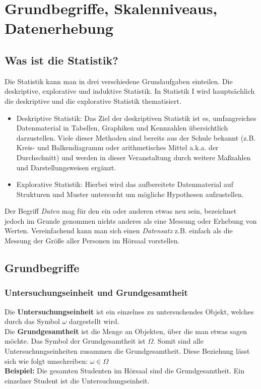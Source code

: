 \documentclass[a4paper]{article}
\begin{document}
\section{Grundbegriffe, Skalenniveaus, Datenerhebung}

\subsection{Was ist die Statistik?}

Die Statistik kann man in drei verschiedene Grundaufgaben einteilen. Die deskriptive, explorative und induktive Statistik. In Statistik I wird hauptsächlich die deskriptive und die explorative Statistik thematisiert.
\begin{itemize}
     \item Deskriptive Statistik: Das Ziel der deskriptiven Statistik ist es, umfangreiches Datenmaterial in Tabellen, Graphiken und Kennzahlen übersichtlich darzustellen. Viele dieser Methoden sind bereits aus der Schule bekannt (z.B. Kreis- und Balkendiagramm oder arithmetisches Mittel a.k.a. der Durchschnitt) und werden in dieser Veranstaltung durch weitere Ma\ss{}zahlen und Darstellungsweisen erg\"anzt.
     \item Explorative Statistik: Hierbei wird das aufbereitete Datenmaterial auf Strukturen und Muster untersucht um mögliche Hypothesen aufzustellen.
\end{itemize}

\noindent Der Begriff \textit{Daten} mag f\"ur den ein oder anderen etwas neu sein, bezeichnet jedoch im Grunde genommen nichts anderes als eine Messung oder Erhebung von Werten. Vereinfachend kann man sich einen \textit{Datensatz} z.B. einfach als die Messung der Gr\"o\ss{}e aller Personen im H\"orsaal vorstellen.

\subsection{Grundbegriffe}
\subsubsection{Untersuchungseinheit und Grundgesamtheit}
Die \textbf{Untersuchungseinheit} ist ein einzelnes zu untersuchendes Objekt, welches durch das Symbol $\omega$ dargestellt wird.
\\Die \textbf{Grundgesamtheit} ist die Menge an Objekten, über die man etwas sagen möchte. Das Symbol der Grundgesamtheit ist $\Omega$. Somit sind alle Untersuchungseinheiten zusammen die Grundgesamtheit. Diese Beziehung lässt sich wie folgt umschreiben: $\omega \in \Omega$
\\ \textbf{Beispiel:} Die gesamten Studenten im H\"orsaal sind die Grundgesamtheit. Ein einzelner Student ist die Untersuchungseinheit.
\end{document}
